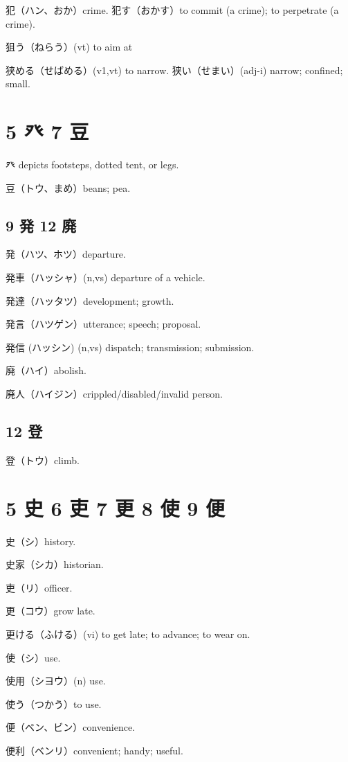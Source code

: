 犯（ハン、おか）crime.
犯す（おかす）to commit (a crime); to perpetrate (a crime).

狙う（ねらう）(vt) to aim at

狭める（せばめる）(v1,vt) to narrow.
狭い（せまい）(adj-i) narrow; confined; small.

\section{5 癶 7 豆}

癶 depicts footsteps, dotted tent, or legs.

豆（トウ、まめ）beans; pea.

\subsection{9 発 12 廃}

発（ハツ、ホツ）departure.

発車（ハッシャ）(n,vs) departure of a vehicle.

発達（ハッタツ）development; growth.

発言（ハツゲン）utterance; speech; proposal.

発信 (ハッシン) (n,vs) dispatch; transmission; submission.

廃（ハイ）abolish.

廃人（ハイジン）crippled/disabled/invalid person.

\subsection{12 登}

登（トウ）climb.

\section{5 史 6 吏 7 更 8 使 9 便}

史（シ）history.

史家（シカ）historian.

吏（リ）officer.

更（コウ）grow late.

更ける（ふける）(vi) to get late; to advance; to wear on.

使（シ）use.

使用（シヨウ）(n) use.

使う（つかう）to use.

便（ベン、ビン）convenience.

便利（ベンリ）convenient; handy; useful.

